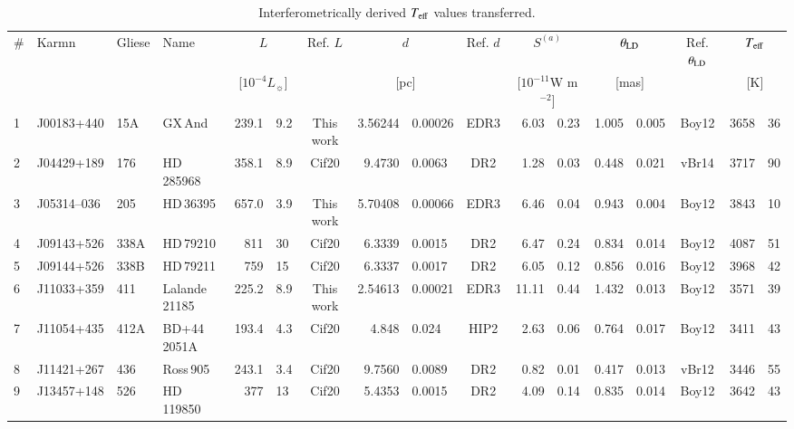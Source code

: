 \documentclass{aa}
\begin{document}
\begin{table*}
\caption{Interferometrically derived $T_{\rm eff}$ values transferred. }
\label{tab:interf_teff}
\centering 
\tiny 
\setlength{\tabcolsep}{0.4em}
\begin{tabular}{llllr@{\,$\pm$\,}lcr@{\,$\pm$\,}lcr@{\,$\pm$\,}lr@{\,$\pm$\,}lcr@{\,$\pm$\,}l}
    \hline 
    \hline 
    \noalign{\smallskip}
 \# & Karmn      & Gliese   &      Name       &\multicolumn{2}{c}{$L$}& Ref. $L$  &\multicolumn{2}{c}{$d$}& Ref. $d$& \multicolumn{2}{c}{$S^{(a)}$}   & \multicolumn{2}{c}{$\theta_{\rm LD}$} & Ref. $\theta_{\rm LD}$ & \multicolumn{2}{c}{$T_{\rm eff}$} \\
   &         &          &                 &\multicolumn{2}{c}{[$10^{-4}L_\sun$]}&      & \multicolumn{2}{c}{[pc]}&     &\multicolumn{2}{c}{[$10^{-11}$W m$^{-2}$]}& \multicolumn{2}{c}{[mas]} &                    & \multicolumn{2}{c}{[K]} \\
    \noalign{\smallskip}
    \hline 
    \noalign{\smallskip}
 1 & J00183+440 &  15A &         GX\,And &  239.1 &  9.2 & This work &   3.56244 &   0.00026 & EDR3 &  6.03 & 0.23 & 1.005 & 0.005 & Boy12 & 3658   & 36 \\
 2 & J04429+189 &  176 &      HD\,285968 &  358.1 &  8.9 &     Cif20 &   9.4730 &   0.0063 &  DR2 &  1.28 & 0.03 & 0.448 & 0.021 & vBr14 & 3717   & 90 \\
 3 & J05314--036 &  205 &       HD\,36395 &  657.0 &  3.9 & This work &   5.70408 &   0.00066 & EDR3 &  6.46 & 0.04 & 0.943 & 0.004 & Boy12 & 3843 & 10 \\
 4 & J09143+526 & 338A &       HD\,79210 &  811   & 30   &     Cif20 &   6.3339 &   0.0015 &  DR2 &  6.47 & 0.24 & 0.834 & 0.014 & Boy12 & 4087   & 51 \\
 5 & J09144+526 & 338B &       HD\,79211 &  759   & 15   &     Cif20 &   6.3337 &   0.0017 &  DR2 &  6.05 & 0.12 & 0.856 & 0.016 & Boy12 & 3968   & 42 \\
 6 & J11033+359 &  411 &  Lalande\,21185 &  225.2 &  8.9 & This work &   2.54613 &   0.00021 & EDR3 & 11.11 & 0.44 & 1.432 & 0.013 & Boy12 & 3571   & 39 \\
 7 & J11054+435 & 412A &    BD+44\,2051A &  193.4 &  4.3 &     Cif20 &   4.848 &   0.024 & HIP2 &  2.63 & 0.06 & 0.764 & 0.017 & Boy12 & 3411   & 43 \\
 8 &J11421+267 &  436 &       Ross\,905 &  243.1 &  3.4 &     Cif20 &   9.7560 &   0.0089 &  DR2 &  0.82 & 0.01 & 0.417 & 0.013 & vBr12 & 3446   & 55 \\
 9 & J13457+148 &  526 &      HD\,119850 &  377   & 13   &     Cif20 &   5.4353 &   0.0015 &  DR2 &  4.09 & 0.14 & 0.835 & 0.014 & Boy12 & 3642   & 43 \\

\end{tabular}
\end{table*}
\end{document}
